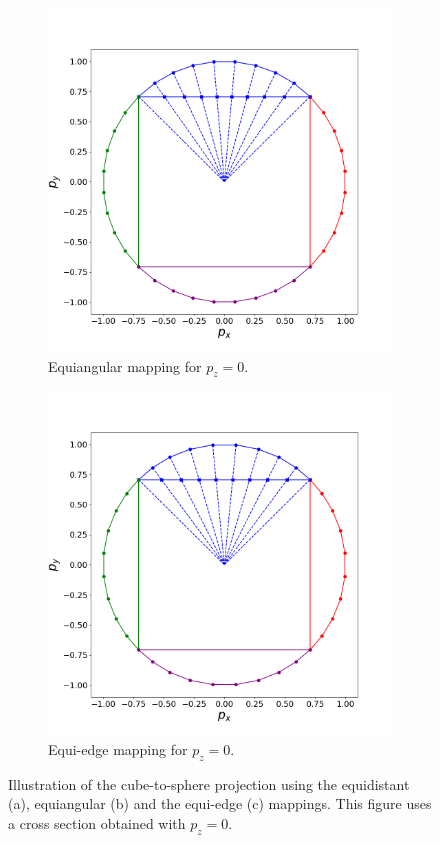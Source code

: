 \documentclass[preprint,12pt]{elsarticle}
\begin{document}
\begin{linenumbers}
\begin{figure}[!htb]
	\begin{subfigure}{0.45\textwidth}
		\centering
		\includegraphics[width=1.1\linewidth]{g2}
		\caption{Equiangular mapping for $p_z=0$.\label{sph-cube-equiangular}}
	\end{subfigure}
	\begin{subfigure}{0.45\textwidth}
	\centering
	\includegraphics[width=1.1\linewidth]{g0}
	\caption{Equi-edge mapping for $p_z=0$.\label{sph-cube-equiedge}}
\end{subfigure}
\caption{Illustration of the cube-to-sphere projection using the equidistant (a),  equiangular (b) and the equi-edge  (c) mappings. This figure uses a cross section obtained with $p_z=0$.}
\label{sph-cube-mappings}
\end{figure}


\end{linenumbers}
\end{document}
